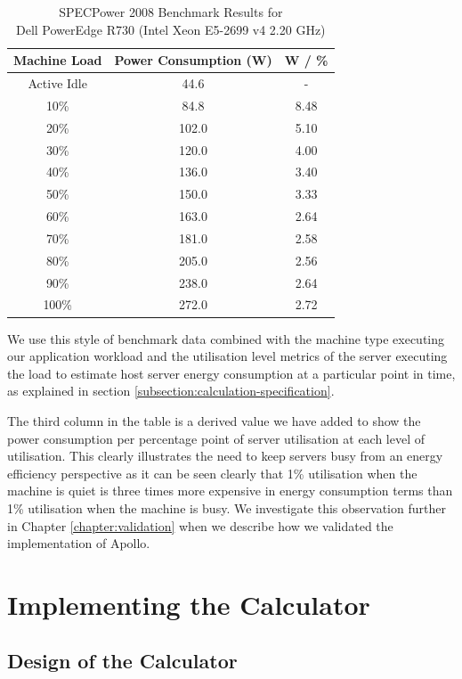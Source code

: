 \begin{table}
\centering
\caption{SPECPower 2008 Benchmark Results for \\Dell PowerEdge R730 (Intel Xeon E5-2699 v4 2.20 GHz)}
\label{table:powervalues}
\footnotesize
\begin{tabular}{|c|c|c|}
\hline
Machine Load & Power Consumption (W) & W / \% \\
\hline
\hline
Active Idle  &  44.6 & -    \\
10\%         &  84.8 & 8.48 \\
20\%         & 102.0 & 5.10 \\
30\%         & 120.0 & 4.00 \\
40\%         & 136.0 & 3.40 \\
50\%         & 150.0 & 3.33 \\
60\%         & 163.0 & 2.64 \\
70\%         & 181.0 & 2.58 \\
80\%         & 205.0 & 2.56 \\
90\%         & 238.0 & 2.64 \\
100\%        & 272.0 & 2.72 \\
\hline
\end{tabular}
\end{table}

We use this style of benchmark data combined with the machine type executing our application workload and the utilisation level metrics of the server executing the load to estimate host server energy consumption at a particular point in time, as explained in section \ref{subsection:calculation-specification}.

The third column in the table is a derived value we have added to show the power consumption per percentage point of server utilisation at each level of utilisation.  This clearly illustrates the need to keep servers busy from an energy efficiency perspective as it can be seen clearly that 1\% utilisation when the machine is quiet is three times more expensive in energy consumption terms than 1\% utilisation when the machine is busy.  We investigate this observation further in Chapter \ref{chapter:validation} when we describe how we validated the implementation of Apollo.

\section{Implementing the Calculator}

\subsection{Design of the Calculator}

